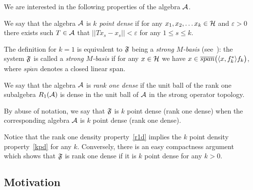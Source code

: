 \documentclass[12pt]{amsart}
\theoremstyle{case}
\begin{document}
    We are interested in the following properties of the algebra $\cal{A}$.
    \begin{definition}
      \label{kpd}
      We say that the algebra $\cal{A}$ is \emph{$k$ point dense} if for any $x_1, x_2,\dots x_k \in \cal{H}$ and $\varepsilon > 0$
        there exists such $T\in \cal{A}$ that $||Tx_s - x_s|| < \varepsilon$ for any $1 \leq s \leq k$.
    \end{definition}
    The definition for $k=1$ is equivalent to $\fsys$ being a \emph{strong $M$-basis} (see~\cite{katavolos}):
      the system $\fsys$ is called a \emph{strong $M$-basis} if for any $x\in\cal{H}$ we have $x \in \overline{span}\big(\inner{x}{f^*_k}f_k\big)$, where
      $\overline{span}$ denotes a closed linear span.
    \begin{definition}
      \label{r1d}
      We say that the algebra $\cal{A}$ is \emph{rank one dense} if the unit ball of the rank one subalgebra $R_1(\cal{A})$
        is dense in the unit ball of $\cal{A}$ in the strong operator topology.
    \end{definition}
    By abuse of notation, we say that $\fsys$ is $k$ point dense (rank one dense)
      when the corresponding algebra $\cal{A}$ is $k$ point dense (rank one dense).

    Notice that the rank one density property~\eqref{r1d} implies the $k$ point density property~\eqref{kpd} for any $k$.
    Conversely, there is an easy compactness argument which shows that $\fsys$ is rank one dense if it is
      $k$ point dense for any $k > 0$.

  \subsection{Motivation}
\end{document}
